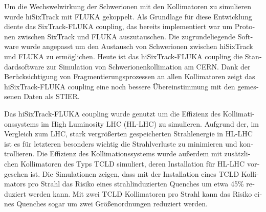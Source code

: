 \begin{otherlanguage}{german}
Um die Wechswelwirkung der Schwerionen mit den Kollimatoren zu simulieren wurde \mbox{hiSixTrack} mit FLUKA gekoppelt. Als Grundlage f\"{u}r diese Entwicklung diente das SixTrack-FLUKA coupling, das bereits implementiert war um Protonen zwischen SixTrack und FLUKA auszutauschen. Die zugrundeliegende Software wurde angepasst um den Austausch von Schwerionen zwischen hiSixTrack und FLUKA zu erm\"{o}glichen. Heute ist das hiSixTrack-FLUKA coupling die Standardsoftware zur Simulation von Schwerionenkollimation am CERN. Dank der Ber\"{u}cksichtigung von Fragmentierungsprozessen an allen Kollimatoren zeigt das hiSixTrack-FLUKA coupling eine noch bessere \"{U}bereinstimmung mit den gemessenen Daten als STIER. 
\vspace{0.2cm}
 
Das hiSixTrack-FLUKA coupling wurde genutzt um die Effizienz des Kollimationssystems im High Luminosity LHC (HL-LHC) zu simulieren. Aufgrund der, im Vergleich zum LHC, stark vergr\"{o}\ss erten gespeicherten Strahlenergie in HL-LHC ist es f\"{u}r letzteren besonders wichtig die Strahlverluste zu minimieren und kontrollieren. Die Effizienz des Kollimationssystems wurde au\ss erdem  mit zus\"{a}tzlichen Kollimatoren des Typs TCLD simuliert, deren Installation f\"{u}r \mbox{HL-LHC} vorgesehen ist. Die Simulationen zeigen, dass mit der Installation eines TCLD Kollimators pro Strahl das Risiko eines strahlinduzierten Quenches um etwa 45\% reduziert werden kann. Mit zwei TCLD Kollimatoren pro Strahl kann das Risiko eines Quenches sogar um zwei Gr\"{o}\ss enordnungen reduziert werden. 
\vspace{0.2cm}


\end{otherlanguage}
